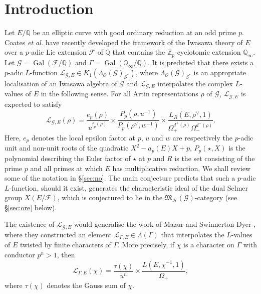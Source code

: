 \documentclass{amsart}
\begin{document}
\section{Introduction}
Let $E/\mathbb{Q}$ be an elliptic curve with good ordinary reduction at an odd prime $p$. Coates {\it et al.} \cite{CKFVS,coateshowson} have recently developed the framework of the Iwasawa theory of $E$ over a $p$-adic Lie extension ${\mathcal{F}}$ of ${\mathbb Q}$ that contains the ${{\mathbb Z}_p}$-cyclotomic extension ${\mathbb Q}_\infty$. Let ${\mathcal{G}}=\operatorname{Gal}({\mathcal{F}}/{\mathbb Q})$ and $\Gamma=\operatorname{Gal}({\mathbb Q}_\infty/{\mathbb Q})$. It is predicted that there exists a $p$-adic $L$-function ${\mathcal{L}}_{{\mathcal{G}},E}\in K_1(\Lambda_{\mathcal{O}}({\mathcal{G}})_{S^*})$, where $\Lambda_{\mathcal{O}}({\mathcal{G}})_{S^*}$ is an appropriate localisation of an Iwasawa algebra of ${\mathcal{G}}$ and ${\mathcal{L}}_{{\mathcal{G}},E}$ interpolates the complex $L$-values of $E$ in the following sense. For all Artin representations $\rho$ of ${\mathcal{G}}$, ${\mathcal{L}}_{{\mathcal{G}},E}$ is expected to satisfy
\begin{equation}\label{eq:ord}
{\mathcal{L}}_{{\mathcal{G}},E}(\rho)=\frac{e_p(\rho)}{u^{{\mathfrak{f}}_p(\rho)}}\times\frac{P_p(\rho,u^{-1})}{P_p(\rho^\vee,w^{-1})}\times\frac{L_R(E,\rho^\vee,1)}{\Omega_+^{d^+(\rho)}\Omega_-^{d^-(\rho)}}.
\end{equation}
Here, $e_p$ denotes the local epsilon factor at $p$, $u$ and $w$ are respectively the $p$-adic unit and non-unit roots of the quadratic $X^2-a_p(E)X+p$, $P_p(\star,X)$ is the polynomial describing the Euler factor of $\star$ at $p$ and $R$ is the set consisting of the prime $p$ and all primes at which $E$ has multiplicative reduction. We shall review some of the notation in \S\ref{sec:no}. The main conjecture predicts that such a $p$-adic $L$-function, should it exist, generates the characteristic ideal of the dual Selmer group $X(E/{\mathcal{F}})$, which is conjectured to lie in the ${\mathfrak{M}_{\mathcal{H}}({\mathcal{G}})}$-category (see \S\ref{sec:ore} below).

The existence of ${\mathcal{L}}_{{\mathcal{G}},E}$ would generalise the work of Mazur and Swinnerton-Dyer \cite{MSD74}, where they constructed an element ${\mathcal{L}}_{\Gamma,E}\in\Lambda(\Gamma)$ that interpolates the $L$-values of $E$ twisted by finite characters of $\Gamma$. More precisely, if $\chi$ is a character on $\Gamma$ with conductor $p^n>1$, then
\[
{\mathcal{L}}_{\Gamma,E}(\chi)=\frac{\tau(\chi)}{u^n}\times\frac{L(E,\chi^{-1},1)}{\Omega_+},
\]
where $\tau(\chi)$ denotes the Gauss sum of $\chi$.
\end{document}
